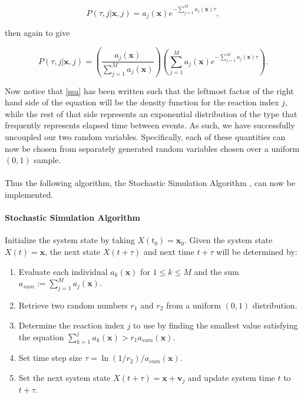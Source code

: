 \documentclass[ugrad,lot,lof,openright,11pt,oneside,onehalfspace]{RUthesis}
\begin{document}
				\begin{equation*}
				P(\tau,j|\mathbf{x},j) = a_j(\mathbf{x})e^{-\sum\limits_{j=1}^M a_j(\mathbf{x})\tau},
				\end{equation*}

				\noindent
				then again to give

				\begin{equation}\label{ssa}
				P(\tau,j|\mathbf{x},j) = \left( \frac{a_j(\mathbf{x})}{\sum\limits_{j=1}^M a_j(\mathbf{x})} \right) \left( \sum\limits_{j=1}^M a_j(\mathbf{x}) e^{-\sum\limits_{j=1}^M a_j(\mathbf{x})\tau} \right).
				\end{equation}

				\noindent
				Now notice that \eqref{ssa} has been written such that the leftmost factor of the right hand side of the equation will be the density function for the reaction index $j$, while the rest of that side represents an exponential distribution of the type that frequently represents elapsed time between events. As such, we have successfully uncoupled our two random variables. Specifically, each of these quantities can now be chosen from separately generated random variables chosen over a uniform $(0,1)$ sample.\\
				\\
				Thus the following algorithm, the Stochastic Simulation Algorithm \cite{ssa_intro}, can now be implemented.

				\paragraph{Stochastic Simulation Algorithm}
				Initialize the system state by taking $X(t_0) = \mathbf{x}_0$. Given the system state $X(t) = \mathbf{x}$, the next state $X(t+\tau)$ and next time $t+\tau$ will be determined by:

				\begin{enumerate}
					\item Evaluate each individual $a_k(\mathbf{x})$ for $1 \leq k \leq M$ and the sum $a_{sum} := \sum_{j=1}^M a_j(\mathbf{x})$.
					\item Retrieve two random numbers $r_1$ and $r_2$ from a uniform $(0,1)$ distribution.
					\item Determine the reaction index $j$ to use by finding the smallest value satisfying the equation $\sum_{k=1}^j a_k(\mathbf{x}) > r_1a_{sum}(\mathbf{x})$.
					\item Set time step size $\tau = \ln(1/r_2)/a_{sum}(\mathbf{x})$.
					\item Set the next system state $X(t+\tau) = \mathbf{x} + \mathbf{v}_j$ and update system time $t$ to $t+\tau$.
				\end{enumerate}
\end{document}
